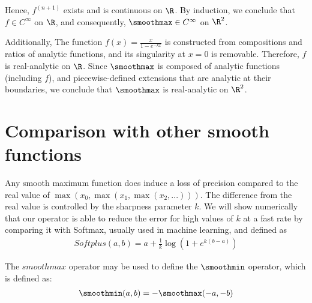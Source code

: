 Hence, $f^{(n+1)}$ exists and is continuous on $\R$. By induction, we conclude that $f \in C^\infty$ on $\R$, and consequently, $\smoothmax \in C^\infty$ on $\R^2$.

\smallConclusion

Additionally, The function $f(x) = \frac{x}{1 - e^{-kx}}$ is constructed from compositions and ratios of analytic functions, and its singularity at $x = 0$ is removable. Therefore, $f$ is real-analytic on $\R$. Since $\smoothmax$ is composed of analytic functions (including $f$), and piecewise-defined extensions that are analytic at their boundaries, we conclude that $\smoothmax$ is real-analytic on $\R^2$.

\section{Comparison with other smooth functions}

Any smooth maximum function does induce a loss of precision compared to the real value of $\max(x_0, \max(x_1, \max(x_2, ...)))$. The difference from the real value is controlled by the sharpness parameter $k$. We will show numerically that our operator is able to reduce the error for high values of $k$ at a fast rate by comparing it with  Softmax, usually used in machine learning, and defined as
\begin{align}
    Softplus(a, b) = a + \frac{1}{k} \log \left(1 + e^{k(b - a)} \right)
\end{align}






The $smoothmax$ operator may be used to define the $\smoothmin$ operator, which is defined as:
\begin{align}
    \smoothmin(a, b) = -\smoothmax(-a, -b)
\end{align}









